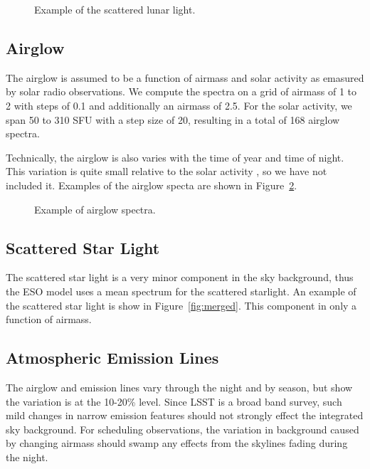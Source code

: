 \documentclass{emulateapj}  %
\begin{document}
\begin{figure}
  \caption{Example of the scattered lunar light. \label{fig:moon}}
\end{figure}


\subsection{Airglow}

The airglow is assumed to be a function of airmass and solar activity as emasured by solar radio observations.  We compute the spectra on a grid of airmass of 1 to 2 with steps of 0.1 and additionally an airmass of 2.5.  For the solar activity, we span 50 to 310 SFU with a step size of 20, resulting in a total of 168 airglow spectra. 

Technically, the airglow is also varies with the time of year and time of night.  This variation is quite small relative to the solar activity \citep{Noll12}, so we have not included it. Examples of the airglow specta are shown in Figure~\ref{fig:airglow}.

\begin{figure}
  \caption{Example of airglow spectra. \label{fig:airglow}}
\end{figure}

  

\subsection{Scattered Star Light}

The scattered star light is a very minor component in the sky background, thus the ESO model uses a mean spectrum for the scattered starlight.  An example of the scattered star light is show in Figure~\ref{fig:merged}. This component in only a function of airmass.


\subsection{Atmospheric Emission Lines}

The airglow and emission lines vary through the night and by season, but \citet{Noll12} show the variation is at the 10-20\% level.  Since LSST is a broad band survey, such mild changes in narrow emission features should not strongly effect the integrated sky background.  For scheduling observations, the variation in background caused by changing airmass should swamp any effects from the skylines fading during the night.
\end{document}
